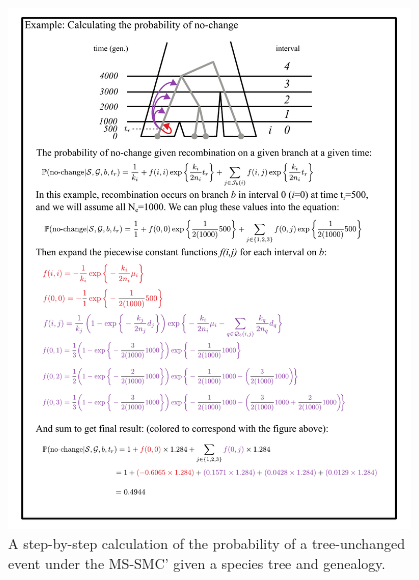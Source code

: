 \documentclass[11pt]{article}
\begin{document}
\begin{figure}[p]
	\centering
	\includegraphics[width=0.95\textwidth]{figures/verbose-equations}
	\caption{A step-by-step calculation of the probability of a tree-unchanged 
	event under the MS-SMC' given a species tree and genealogy.
	}
	\label{fig:figS-tree-equations}
\end{figure}
\end{document}
